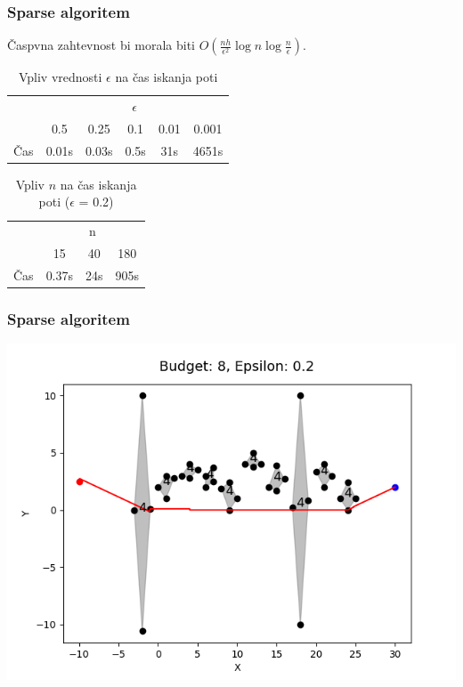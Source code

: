 \documentclass{beamer}
\begin{document}
\begin{frame}
    \frametitle{Sparse algoritem}

    Časpvna zahtevnost bi morala biti $O(\frac{nh}{\epsilon^2} \log n \log \frac{n}{\epsilon})$.

    \begin{table}[h]
        \centering
        \begin{tabular}{|c|c|c|c|c|c|}
            \hline
            & \multicolumn{5}{c|}{$\epsilon$} \\
            \cline{2-6}
            & 0.5 & 0.25 & 0.1 & 0.01 & 0.001 \\
            \hline
            Čas & 0.01s & 0.03s & 0.5s & 31s & 4651s \\
            \hline
        \end{tabular}
        \caption{Vpliv vrednosti $\epsilon$ na čas iskanja poti}
    \end{table}

    \begin{table}[h]
        \centering
        \begin{tabular}{|c|c|c|c|}
            \hline
            & \multicolumn{3}{c|}{n} \\
            \cline{2-4}
            & 15 & 40 & 180 \\
            \hline
            Čas & 0.37s & 24s &  905s \\
            \hline
        \end{tabular}
        \caption{Vpliv $n$ na čas iskanja poti ($\epsilon$ = 0.2)}

    \end{table}
    
\end{frame}

\begin{frame}
    \frametitle{Sparse algoritem}

    \includegraphics[width=1\textwidth]{pr4_5.png}


\end{frame}
\end{document}

